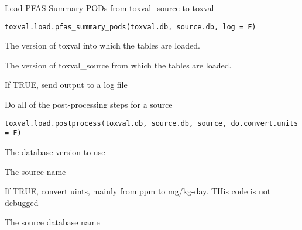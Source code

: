 \documentclass[letterpaper]{book}
\begin{document}
%
\begin{Description}\relax
Load PFAS Summary PODs from toxval\_source to toxval
\end{Description}
%
\begin{Usage}
\begin{verbatim}
toxval.load.pfas_summary_pods(toxval.db, source.db, log = F)
\end{verbatim}
\end{Usage}
%
\begin{Arguments}
\begin{ldescription}
\item[\code{toxval.db}] The version of toxval into which the tables are loaded.

\item[\code{source.db}] The version of toxval\_source from which the tables are loaded.

\item[\code{log}] If TRUE, send output to a log file
\end{ldescription}
\end{Arguments}
%
\begin{Description}\relax
Do all of the post-processing steps for a source
\end{Description}
%
\begin{Usage}
\begin{verbatim}
toxval.load.postprocess(toxval.db, source.db, source, do.convert.units = F)
\end{verbatim}
\end{Usage}
%
\begin{Arguments}
\begin{ldescription}
\item[\code{toxval.db}] The database version to use

\item[\code{source}] The source name

\item[\code{do.convert.units}] If TRUE, convert uints, mainly from ppm to mg/kg-day. THis code is not debugged

\item[\code{sourcedb}] The source database name
\end{ldescription}
\end{Arguments}
\end{document}
